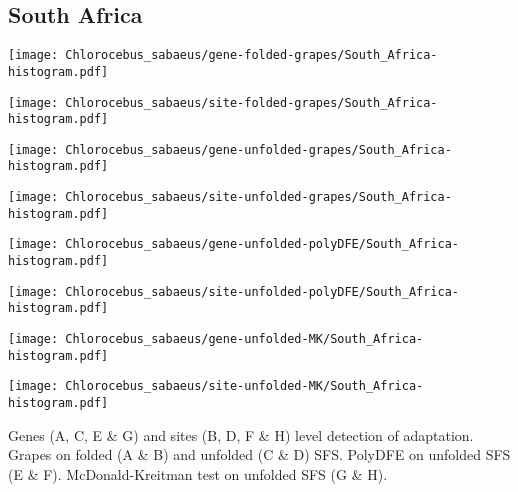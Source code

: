\documentclass{article}
\begin{document}
\pagebreak
\subsection{South Africa}
\centering
\begin{minipage}{0.49\linewidth}
    \texttt{[image: Chlorocebus\_sabaeus/gene-folded-grapes/South\_Africa-histogram.pdf]}
\end{minipage}%
\hfill
\begin{minipage}{0.49\linewidth}
    \texttt{[image: Chlorocebus\_sabaeus/site-folded-grapes/South\_Africa-histogram.pdf]}
\end{minipage}
\hfill
\begin{minipage}{0.49\linewidth}
    \texttt{[image: Chlorocebus\_sabaeus/gene-unfolded-grapes/South\_Africa-histogram.pdf]}
\end{minipage}%
\hfill
\begin{minipage}{0.49\linewidth}
    \texttt{[image: Chlorocebus\_sabaeus/site-unfolded-grapes/South\_Africa-histogram.pdf]}
\end{minipage}
\hfill
\begin{minipage}{0.49\linewidth}
    \texttt{[image: Chlorocebus\_sabaeus/gene-unfolded-polyDFE/South\_Africa-histogram.pdf]}
\end{minipage}%
\hfill
\begin{minipage}{0.49\linewidth}
    \texttt{[image: Chlorocebus\_sabaeus/site-unfolded-polyDFE/South\_Africa-histogram.pdf]}
\end{minipage}
\hfill
\begin{minipage}{0.49\linewidth}
    \texttt{[image: Chlorocebus\_sabaeus/gene-unfolded-MK/South\_Africa-histogram.pdf]}
\end{minipage}%
\hfill
\begin{minipage}{0.49\linewidth}
    \texttt{[image: Chlorocebus\_sabaeus/site-unfolded-MK/South\_Africa-histogram.pdf]}
\end{minipage}
\hfill
\flushleft
Genes (A, C, E \& G) and sites (B, D, F \& H) level detection of adaptation.
Grapes on folded (A \& B) and unfolded (C \& D) SFS.
PolyDFE on unfolded SFS (E \& F).
McDonald-Kreitman test on unfolded SFS (G \& H).
\end{document}
